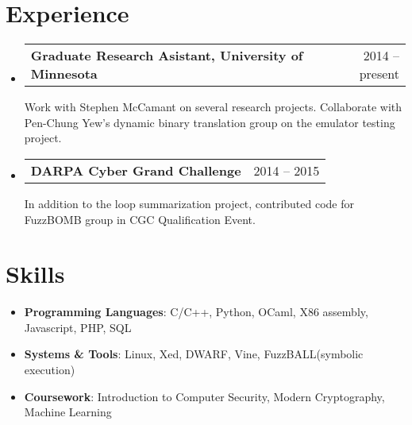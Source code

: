 \documentclass[letterpaper,11pt]{article}
\makeatletter
\newcommand{\resumeItem}[2]{
  \item[]\small{
    \textbf{#1}{: #2 \vspace{-2pt}}
  }
}
\newcommand{\projectSubheading}[3]{
  \vspace{-1pt}\item[]
  \begin{tabular*}{0.97\textwidth}{l@{\extracolsep{\fill}}r}
  \textbf{\small#1} & {\small#2}\\
  \end{tabular*}
      {\small#3}\vspace{-5pt}
}
\newcommand{\resumeSubHeadingListStart}{\begin{itemize}[leftmargin=*]}
\newcommand{\resumeSubHeadingListEnd}{\end{itemize}}
\makeatother
\begin{document}
%
\section{Experience}
  \resumeSubHeadingListStart
  \projectSubheading
      {Graduate Research Asistant, University of Minnesota}{2014 -- present}
      {Work with Stephen McCamant on several research projects. Collaborate with Pen-Chung Yew's dynamic binary translation group on the emulator testing project.}    
    \projectSubheading
      {DARPA Cyber Grand Challenge}{2014 -- 2015}
      {In addition to the loop summarization project, contributed code for 
      FuzzBOMB group in CGC Qualification Event.}  
  \resumeSubHeadingListEnd
  
  
%
\section{Skills}	
 \resumeSubHeadingListStart
 	\resumeItem{Programming Languages}
    {C/C++, Python, OCaml, X86 assembly, Javascript, PHP, SQL} 
    \resumeItem{Systems \& Tools}
    {Linux, Xed, DWARF, Vine, FuzzBALL(symbolic execution)}
    \resumeItem{Coursework}
    {Introduction to Computer Security, Modern Cryptography, Machine Learning}
 \resumeSubHeadingListEnd


\end{document}
